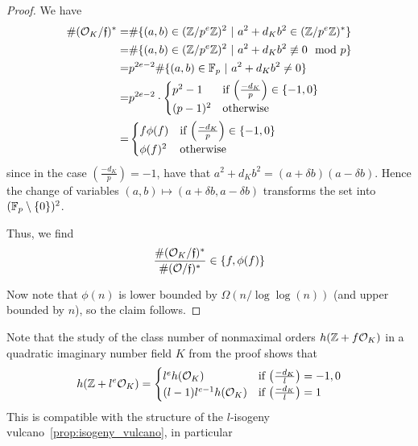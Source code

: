 \begin{proof}
    We have
    \begin{align*}
        \#(\mathcal{O}_K/\mathfrak{f})^* =& \#\{ (a, b) \in (\mathbb{Z}/p^e\mathbb{Z})^2 \ | \ a^2 + d_K b^2 \in (\mathbb{Z}/p^e\mathbb{Z})^* \} \\
        =& \#\{ (a, b) \in (\mathbb{Z}/p^e\mathbb{Z})^2 \ | \ a^2 + d_K b^2 \not\equiv 0 \mod p \} \\
        =& p^{2e - 2} \#\{ (a, b) \in \mathbb{F}_p \ | \ a^2 + d_K b^2 \neq 0 \} \\
        =& p^{2e - 2} \cdot \begin{cases}
            p^2 - 1 & \text{if $\left(\frac {-d_K} p \right) \in \{ -1, 0 \}$} \\
            (p - 1)^2 & \text{otherwise}
        \end{cases} \\
        =& \begin{cases}
            f \phi(f) & \text{if $\left(\frac {-d_K} p \right) \in \{ -1, 0 \}$} \\
            \phi(f)^2 & \text{otherwise}
        \end{cases}
    \end{align*}
    since in the case $\left(\frac {-d_K} p \right) = -1$, have that $a^2 + d_K b^2 = (a + \delta b)(a - \delta b)$.
    Hence the change of variables $(a, b) \mapsto (a + \delta b, a - \delta b)$ transforms the set into $(\mathbb{F}_p \setminus \{0\})^2$.

    Thus, we find
    \begin{equation*}
        \frac {\#(\mathcal{O}_K/\mathfrak{f})^*} {\#(\mathcal{O}/\mathfrak{f})^*} \in \{ f, \phi(f) \}
    \end{equation*}

    Now note that $\phi(n)$ is lower bounded by $\Omega(n/\log\log(n))$ (and upper bounded by $n$), so the claim follows.
\end{proof}
Note that the study of the class number of nonmaximal orders $h(\mathbb{Z} + f\mathcal{O}_K)$ in a quadratic imaginary number field $K$ from the proof shows that
\begin{equation*}
    h(\mathbb{Z} + l^e\mathcal{O}_K) = \begin{cases}
        l^e h(\mathcal{O}_K) & \text{if $\left(\frac {-d_K} l\right) = -1, 0$} \\
        (l - 1) l^{e - 1} h(\mathcal{O}_K) & \text{if $\left(\frac {-d_K} l\right) = 1$}
    \end{cases}
\end{equation*}
This is compatible with the structure of the $l$-isogeny vulcano~\ref{prop:isogeny_vulcano}, in particular
